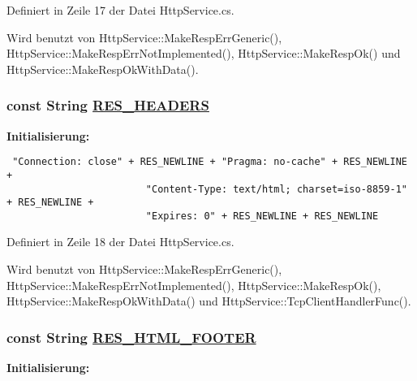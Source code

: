 Definiert in Zeile 17 der Datei Http\-Service.cs.

Wird benutzt von Http\-Service::Make\-Resp\-Err\-Generic(), Http\-Service::Make\-Resp\-Err\-Not\-Implemented(), Http\-Service::Make\-Resp\-Ok() und Http\-Service::Make\-Resp\-Ok\-With\-Data().\hypertarget{classQbeSAS_1_1HttpService_QbeSAS_1_1HttpServicer2}{
\subsubsection[RES\_\-HEADERS]{\setlength{\rightskip}{0pt plus 5cm}const String \hyperlink{classQbeSAS_1_1HttpService_QbeSAS_1_1HttpServicer2}{RES\_\-HEADERS}}}
\label{classQbeSAS_1_1HttpService_QbeSAS_1_1HttpServicer2}


{\bf Initialisierung:}

\footnotesize\begin{verbatim} "Connection: close" + RES_NEWLINE + "Pragma: no-cache" + RES_NEWLINE + 
                        "Content-Type: text/html; charset=iso-8859-1" + RES_NEWLINE + 
                        "Expires: 0" + RES_NEWLINE + RES_NEWLINE
\end{verbatim}\normalsize 


Definiert in Zeile 18 der Datei Http\-Service.cs.

Wird benutzt von Http\-Service::Make\-Resp\-Err\-Generic(), Http\-Service::Make\-Resp\-Err\-Not\-Implemented(), Http\-Service::Make\-Resp\-Ok(), Http\-Service::Make\-Resp\-Ok\-With\-Data() und Http\-Service::Tcp\-Client\-Handler\-Func().\hypertarget{classQbeSAS_1_1HttpService_QbeSAS_1_1HttpServicer13}{
\subsubsection[RES\_\-HTML\_\-FOOTER]{\setlength{\rightskip}{0pt plus 5cm}const String \hyperlink{classQbeSAS_1_1HttpService_QbeSAS_1_1HttpServicer13}{RES\_\-HTML\_\-FOOTER}}}
\label{classQbeSAS_1_1HttpService_QbeSAS_1_1HttpServicer13}


{\bf Initialisierung:}

